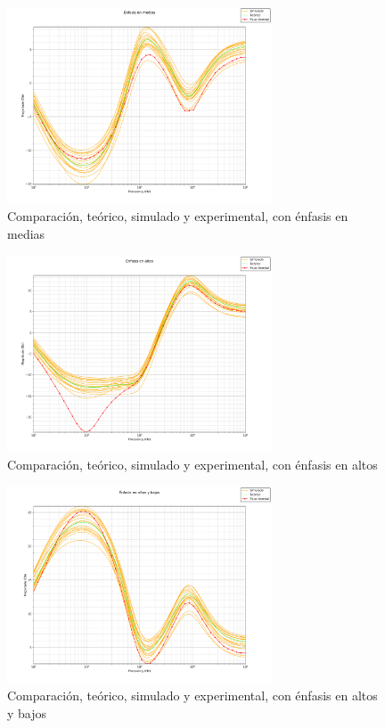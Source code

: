 \begin{figure}[H]
    \centering
    \includegraphics[width=0.7\textwidth]{../EJ5/latex_resources/-B+M-A}
    \caption{Comparación, teórico, simulado y experimental, con énfasis en medias}
    \label{fig:emphasis_in_mid_ex}
\end{figure}

\begin{figure}[H]
    \centering
    \includegraphics[width=0.7\textwidth]{../EJ5/latex_resources/-B-M+A}
    \caption{Comparación, teórico, simulado y experimental, con énfasis en altos}
    \label{fig:emphasis_in_high_ex}
\end{figure}

\begin{figure}[H]
    \centering
    \includegraphics[width=0.7\textwidth]{../EJ5/latex_resources/+B-M+A}
    \caption{Comparación, teórico, simulado y experimental, con énfasis en altos y bajos}
    \label{fig:emphasis_in_high_and_low_ex}
\end{figure}

